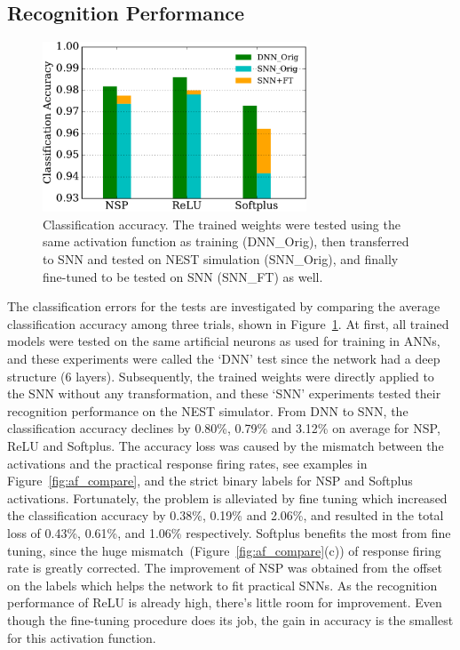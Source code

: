 
\subsection{Recognition Performance}	
	\begin{figure}[tbp!]
		\centering
		\includegraphics[width=0.7\textwidth]{pics_iconip/9-2.pdf}
		\caption{Classification accuracy.
			The trained weights were tested using the same activation function as training (DNN\_Orig), then transferred to \DIFaddbeginFL {}\DIFaddendFL SNN and tested on NEST simulation (SNN\_Orig), and finally fine-tuned to be tested on SNN (SNN\_FT) as well.  }
		\label{Fig:result_bar}
	\end{figure}
	The classification errors for the tests are investigated by comparing the average classification accuracy among three trials, shown in Figure~\ref{Fig:result_bar}.
	At first, all trained models were tested on the same artificial neurons as used for training in ANNs, and these experiments were called the `DNN' test since the network had a deep structure (6 layers).
	Subsequently, the trained weights were directly applied to the SNN without any transformation, and these `SNN' experiments tested their recognition performance on the NEST simulator.
	From DNN to SNN, the classification accuracy declines by 0.80\%, 0.79\% and 3.12\% on average for NSP, ReLU and Softplus.
	The accuracy loss was caused by the mismatch between the activations and the practical response firing rates, see examples in Figure~\ref{fig:af_compare}, and the strict binary labels for NSP and Softplus activations.
	Fortunately, the problem is alleviated by fine tuning which increased the classification accuracy by 0.38\%, 0.19\% and 2.06\%, and resulted in the total loss of 0.43\%, 0.61\%, and 1.06\% respectively.
	Softplus benefits the most from fine tuning, since the huge mismatch~(Figure~\ref{fig:af_compare}(c)) of response firing rate is greatly corrected.
	The improvement of NSP was obtained from the offset on the labels which helps the network to fit practical SNNs.
	As the recognition performance of ReLU is already high, there's little room for improvement.
	Even though the fine-tuning procedure does its job, the gain in accuracy is the smallest for this activation function.

